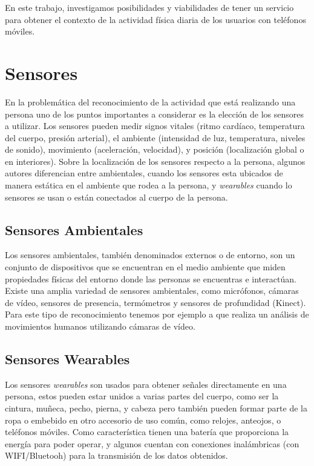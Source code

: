 En este trabajo, investigamos posibilidades y viabilidades de tener
un servicio para obtener el contexto de la actividad física diaria
de los usuarios con teléfonos móviles.

\section{Sensores}

\label{sec23:sensores} En la problemática del reconocimiento de la
actividad que está realizando una persona uno de los puntos importantes
a considerar es la elección de los sensores a utilizar. Los sensores
pueden medir signos vitales (ritmo cardíaco, temperatura del cuerpo,
presión arterial), el ambiente (intensidad de luz, temperatura, niveles
de sonido), movimiento (aceleración, velocidad), y posición (localización
global o en interiores). Sobre la localización de los sensores respecto
a la persona, algunos autores \cite{ReyesOrtiz2015} diferencian entre
ambientales, cuando los sensores esta ubicados de manera estática
en el ambiente que rodea a la persona, y \emph{wearables} cuando lo
sensores se usan o están conectados al cuerpo de la persona.

\subsection{Sensores Ambientales}

Los sensores ambientales, también denominados externos o de entorno,
son un conjunto de dispositivos que se encuentran en el medio ambiente
que miden propiedades físicas del entorno donde las personas se encuentras
e interactúan. Existe una amplia variedad de sensores ambientales,
como micrófonos, cámaras de vídeo, sensores de presencia, termómetros
y sensores de profundidad (Kinect). Para este tipo de reconocimiento
tenemos por ejemplo a \cite{Poppe2007} que realiza un análisis de
movimientos humanos utilizando cámaras de vídeo.

\subsection{Sensores Wearables}

Los sensores \emph{wearables} son usados para obtener señales directamente
en una persona, estos pueden estar unidos a varias partes del cuerpo,
como ser la cintura, muñeca, pecho, pierna, y cabeza \cite{Bao2004}
pero también pueden formar parte de la ropa o embebido en otro accesorio
de uso común, como relojes, anteojos, o teléfonos móviles. Como característica
tienen una batería que proporciona la energía para poder operar, y
algunos cuentan con conexiones inalámbricas (con WIFI/Bluetooh) para
la transmisión de los datos obtenidos.

